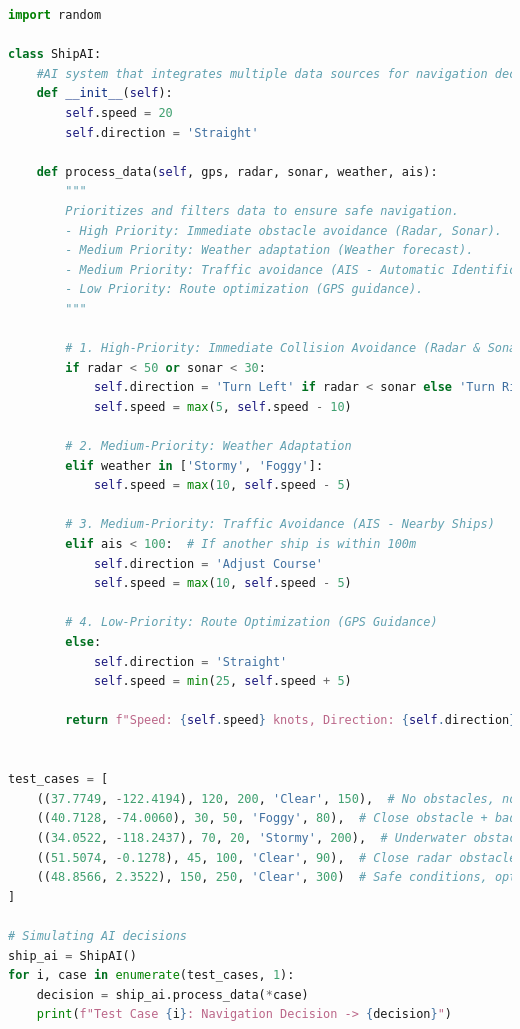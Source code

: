 \documentclass{article}
\begin{document}
\begin{lstlisting}[language=Python, caption={AI Agent for Autonomous Ship Navigation}]
import random

class ShipAI:
    #AI system that integrates multiple data sources for navigation decisions.
    def __init__(self):
        self.speed = 20  
        self.direction = 'Straight'
    
    def process_data(self, gps, radar, sonar, weather, ais):
        """
        Prioritizes and filters data to ensure safe navigation.
        - High Priority: Immediate obstacle avoidance (Radar, Sonar).
        - Medium Priority: Weather adaptation (Weather forecast).
        - Medium Priority: Traffic avoidance (AIS - Automatic Identification System).
        - Low Priority: Route optimization (GPS guidance).
        """
        
        # 1. High-Priority: Immediate Collision Avoidance (Radar & Sonar)
        if radar < 50 or sonar < 30:
            self.direction = 'Turn Left' if radar < sonar else 'Turn Right'
            self.speed = max(5, self.speed - 10)  
        
        # 2. Medium-Priority: Weather Adaptation
        elif weather in ['Stormy', 'Foggy']:
            self.speed = max(10, self.speed - 5)  
        
        # 3. Medium-Priority: Traffic Avoidance (AIS - Nearby Ships)
        elif ais < 100:  # If another ship is within 100m
            self.direction = 'Adjust Course'
            self.speed = max(10, self.speed - 5)  
        
        # 4. Low-Priority: Route Optimization (GPS Guidance)
        else:
            self.direction = 'Straight'
            self.speed = min(25, self.speed + 5)  
        
        return f"Speed: {self.speed} knots, Direction: {self.direction}"


test_cases = [
    ((37.7749, -122.4194), 120, 200, 'Clear', 150),  # No obstacles, normal weather
    ((40.7128, -74.0060), 30, 50, 'Foggy', 80),  # Close obstacle + bad weather + traffic
    ((34.0522, -118.2437), 70, 20, 'Stormy', 200),  # Underwater obstacle + storm
    ((51.5074, -0.1278), 45, 100, 'Clear', 90),  # Close radar obstacle, adjust course
    ((48.8566, 2.3522), 150, 250, 'Clear', 300)  # Safe conditions, optimize speed
]

# Simulating AI decisions
ship_ai = ShipAI()
for i, case in enumerate(test_cases, 1):
    decision = ship_ai.process_data(*case)
    print(f"Test Case {i}: Navigation Decision -> {decision}")

\end{lstlisting}
\end{document}
